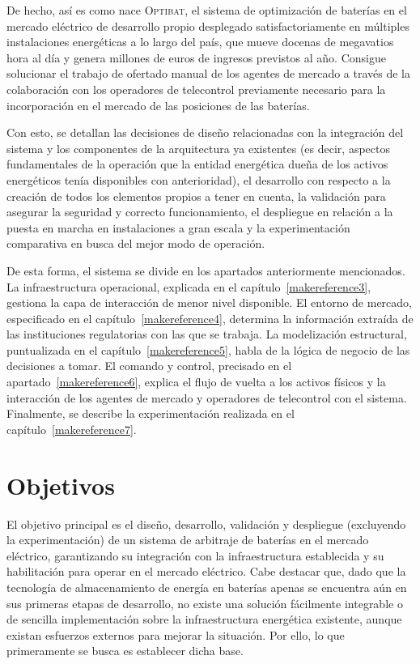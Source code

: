 De hecho, así es como nace \textsc{Optibat}, el sistema de optimización de baterías en el mercado eléctrico de desarrollo propio desplegado satisfactoriamente en múltiples instalaciones energéticas a lo largo del país, que mueve docenas de megavatios hora al día y genera millones de euros de ingresos previstos al año. Consigue solucionar el trabajo de ofertado manual de los agentes de mercado a través de la colaboración con los operadores de telecontrol previamente necesario para la incorporación en el mercado de las posiciones de las baterías.

Con esto, se detallan las decisiones de diseño relacionadas con la integración del sistema y los componentes de la arquitectura ya existentes (es decir, aspectos fundamentales de la operación que la entidad energética dueña de los activos energéticos tenía disponibles con anterioridad), el desarrollo con respecto a la creación de todos los elementos propios a tener en cuenta, la validación para asegurar la seguridad y correcto funcionamiento, el despliegue en relación a la puesta en marcha en instalaciones a gran escala y la experimentación comparativa en busca del mejor modo de operación.

De esta forma, el sistema se divide en los apartados anteriormente mencionados. La infraestructura operacional, explicada en el capítulo~\ref{makereference3}, gestiona la capa de interacción de menor nivel disponible. El entorno de mercado, especificado en el capítulo~\ref{makereference4}, determina la información extraída de las instituciones regulatorias con las que se trabaja. La modelización estructural, puntualizada en el capítulo~\ref{makereference5}, habla de la lógica de negocio de las decisiones a tomar. El comando y control, precisado en el apartado~\ref{makereference6}, explica el flujo de vuelta a los activos físicos y la interacción de los agentes de mercado y operadores de telecontrol con el sistema. Finalmente, se describe la experimentación realizada en el capítulo~\ref{makereference7}.

\section{Objetivos}
\label{makereference1.1}

El objetivo principal es el diseño, desarrollo, validación y despliegue (excluyendo la experimentación) de un sistema de arbitraje de baterías en el mercado eléctrico, garantizando su integración con la infraestructura establecida y su habilitación para operar en el mercado eléctrico. Cabe destacar que, dado que la tecnología de almacenamiento de energía en baterías apenas se encuentra aún en sus primeras etapas de desarrollo, no existe una solución fácilmente integrable o de sencilla implementación sobre la infraestructura energética existente, aunque existan esfuerzos externos para mejorar la situación. Por ello, lo que primeramente se busca es establecer dicha base.

